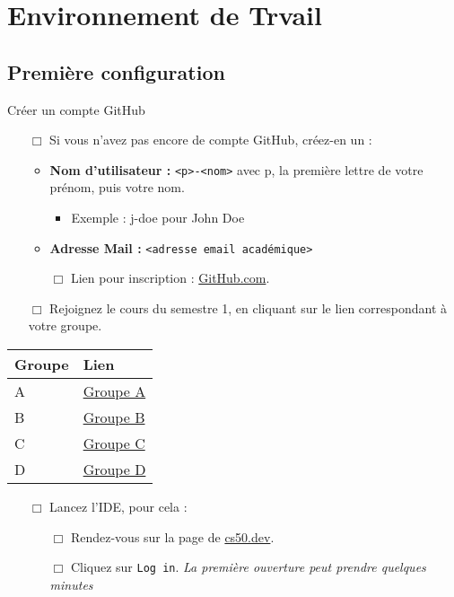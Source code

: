 
\section{Environnement de Trvail}

\subsection{Première configuration}

\begin{UPSTIManipulation}{Créer un compte GitHub}
	\begin{itemize}
		\item[$\Box$] Si vous n'avez pas encore de compte GitHub, créez-en un :
		      \begin{itemize}
			      \item \textbf{Nom d'utilisateur :} \texttt{<p>-<nom>} avec p, la première lettre de votre prénom, puis votre nom.
			            \begin{itemize}
				            \item Exemple : j-doe pour John Doe
			            \end{itemize}
			      \item \textbf{Adresse Mail :} \texttt{<adresse email académique>}
			      \item[$\Box$] Lien pour inscription : \href{https://github.com}{GitHub.com}.
		      \end{itemize}
		\item[$\Box$] Rejoignez le cours du semestre 1, en cliquant sur le lien correspondant à votre groupe.
	\end{itemize}
	\begin{center}
		\begin{tabular}{|l|l|}
			\hline
			Groupe & Lien                                                                             \\
			\hline
			A      & \href{https://submit.cs50.io/invites/9a6f6de5408b4022baebeb336f409261}{Groupe A} \\
			B      & \href{https://submit.cs50.io/invites/f70e5bcd71c941a7acd2cbd7739218d8}{Groupe B} \\
			C      & \href{https://submit.cs50.io/invites/88bf318c8b054f7a959ea7371f2b8011}{Groupe C} \\
			D      & \href{https://submit.cs50.io/invites/e58130b1d7874ca481da62a0795da120}{Groupe D} \\
			\hline
		\end{tabular}
	\end{center}
	\begin{itemize}
		\item[$\Box$] Lancez l'IDE, pour cela :
		      \begin{itemize}
			      \item[$\Box$] Rendez-vous sur la page de \href{https://cs50.dev}{cs50.dev}.
			      \item[$\Box$] Cliquez sur \texttt{Log in}. \textit{La première ouverture peut prendre quelques minutes}
		      \end{itemize}
	\end{itemize}
\end{UPSTIManipulation}

